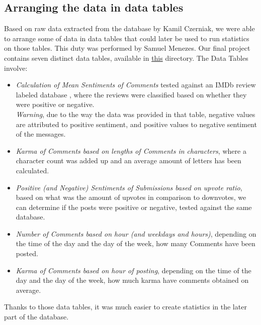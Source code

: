 \documentclass[openany]{article}
\begin{document}
\subsection{Arranging the data in data tables}
\label{sec:datatables}
Based on raw data extracted from the database by Kamil Czerniak, we were able to arrange some of data in data tables that could later be used to run statistics on those tables. This duty was performed by Samuel Menezes. Our final project contains seven distinct data tables, available in \href{https://drive.google.com/drive/folders/1ROxIWmS5nnnhzwUUQuyAWV5oK8KLdnb9}{this} directory. The Data Tables involve:
\begin{itemize}
    \item \textit{Calculation of Mean Sentiments of Comments} tested against an IMDb review labeled database \cite{sentimentanalysis}, where the reviews were classified based on whether they were positive or negative. \\
    \textit{Warning}, due to the way the data was provided in that table, negative values are attributed to positive sentiment, and positive values to negative sentiment of the messages.
    \item \textit{Karma of Comments based on lengths of Comments in characters}, where a character count was added up and an average amount of letters has been calculated.
    \item \textit{Positive (and Negative) Sentiments of Submissions based on upvote ratio}, based on what was the amount of upvotes in comparison to downvotes, we can determine if the posts were positive or negative, tested against the same database.
    \item \textit{Number of Comments based on hour (and weekdays and hours)}, depending on the time of the day and the day of the week, how many Comments have been posted.
    \item \textit{Karma of Comments based on hour of posting}, depending on the time of the day and the day of the week, how much karma have comments obtained on average.
\end{itemize}
Thanks to those data tables, it was much easier to create statistics in the later part of the database.
\end{document}
